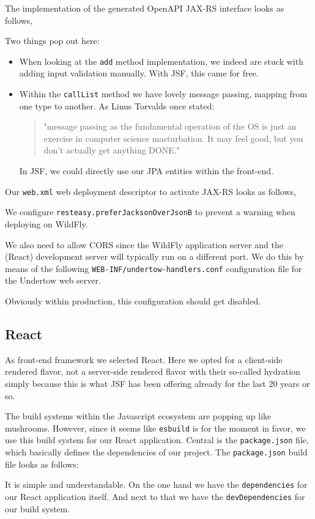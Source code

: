 The implementation of the generated OpenAPI JAX-RS interface looks as follows,

Two things pop out here:
\begin{itemize}
	\item When looking at the \texttt{add} method implementation, we indeed are stuck with adding input validation manually.
	With JSF, this came for free.
	\item Within the \texttt{callList} method we have lovely message passing, mapping from one type to another.
	As Linus Torvalds once stated:
	\begin{quote}
		"message passing as the fundamental operation of the OS is just an exercise in computer science masturbation.
		It may feel good, but you don’t actually get anything DONE."
	\end{quote}
	In JSF, we could directly use our JPA entities within the front-end.
\end{itemize}

Our \texttt{web.xml} web deployment descriptor to activate JAX-RS looks as follows,

We configure \texttt{resteasy.preferJacksonOverJsonB} to prevent a warning when deploying on WildFly.

We also need to allow CORS since the WildFly application server and the (React) development server will typically run on a different port.
We do this by means of the following \texttt{WEB-INF/undertow-handlers.conf} configuration file for the Undertow web server.

Obviously within production, this configuration should get disabled.

\subsection{React}
As front-end framework we selected React.
Here we opted for a client-side rendered flavor, not a server-side rendered flavor with their so-called hydration simply because this is what JSF has been offering already for the last 20 years or so.

The build systems within the Javascript ecosystem are popping up like mushrooms.
However, since it seems like \texttt{esbuild} is for the moment in favor, we use this build system for our React application.
Central is the \texttt{package.json} file, which basically defines the dependencies of our project.
The \texttt{package.json} build file looks as follows:

It is simple and understandable.
On the one hand we have the \texttt{dependencies} for our React application itself.
And next to that we have the \texttt{devDependencies} for our build system.

